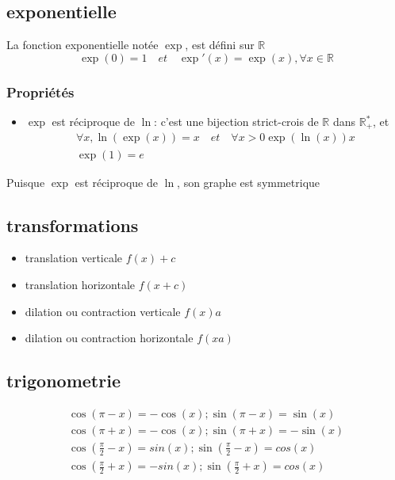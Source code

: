 	\subsection{exponentielle}
	\begin{definition}
		La fonction exponentielle not\'ee $\exp$, est d\'efini sur $\mathbb{R}$
		\begin{equation}
			\exp(0)=1 \quad et \quad \exp'(x)=\exp(x), \forall x \in \mathbb{R}  
		\end{equation}
		\subsubsection{Propri\'et\'es}
		\begin{itemize}
			\item $\exp$ est r\'eciproque de $\ln$: c'est une bijection strict-crois de $\mathbb{R}$ dans $\mathbb{R}_+^*$, et
			\begin{align*}
				\forall x, \ln(\exp(x)) = x \quad et \quad \forall x>0 \exp(\ln(x))x \\
				\exp(1)=e
			\end{align*}
			
		\end{itemize}
		Puisque $\exp$ est r\'eciproque de $\ln$, son graphe est symmetrique

	\end{definition}
	
	\subsection{transformations}
	\begin{itemize}
		\item translation verticale $f(x) +c$
		\item translation horizontale $f(x+c)$
		\item dilation ou contraction verticale $f(x)a$
		\item dilation ou contraction horizontale $f(xa)$
	\end{itemize}
	\subsection{trigonometrie}
	\begin{align*}
		\cos(\pi -x) =  -\cos(x); \sin(\pi-x)=\sin(x) \\
		\cos(\pi+x) = -\cos(x); \sin(\pi+x)=-\sin(x) \\
		\cos(\frac{\pi}{2}-x)=sin(x); \sin(\frac{\pi}{2}-x)=cos(x) \\
		\cos(\frac{\pi}{2}+x)=-sin(x); \sin(\frac{\pi}{2}+x)=cos(x)
	\end{align*}
	

